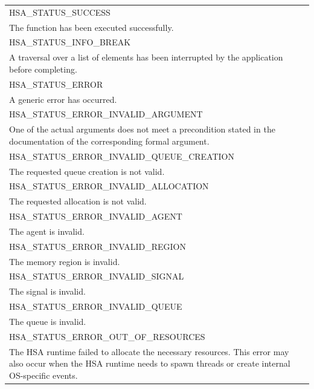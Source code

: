 \documentclass[final,oneside]{book}
\newcommand{\reftyp}[1]{#1}
\newcommand{\refenu}[1]{\reftyp{#1}}
\begin{document}
\begin{longtable}{@{\hspace{2em}}p{\linewidth-2em}}
\hspace{-2em}\refenu{HSA_\-STATUS_\-SUCCESS}\\The function has been executed successfully.\\[2mm]
\hspace{-2em}\refenu{HSA_\-STATUS_\-INFO_\-BREAK}\\A traversal over a list of elements has been interrupted by the application before completing.\\[2mm]
\hspace{-2em}\refenu{HSA_\-STATUS_\-ERROR}\\A generic error has occurred.\\[2mm]
\hspace{-2em}\refenu{HSA_\-STATUS_\-ERROR_\-INVALID_\-ARGUMENT}\\One of the actual arguments does not meet a precondition stated in the documentation of the corresponding formal argument.\\[2mm]
\hspace{-2em}\refenu{HSA_\-STATUS_\-ERROR_\-INVALID_\-QUEUE_\-CREATION}\\The requested queue creation is not valid.\\[2mm]
\hspace{-2em}\refenu{HSA_\-STATUS_\-ERROR_\-INVALID_\-ALLOCATION}\\The requested allocation is not valid.\\[2mm]
\hspace{-2em}\refenu{HSA_\-STATUS_\-ERROR_\-INVALID_\-AGENT}\\The agent is invalid.\\[2mm]
\hspace{-2em}\refenu{HSA_\-STATUS_\-ERROR_\-INVALID_\-REGION}\\The memory region is invalid.\\[2mm]
\hspace{-2em}\refenu{HSA_\-STATUS_\-ERROR_\-INVALID_\-SIGNAL}\\The signal is invalid.\\[2mm]
\hspace{-2em}\refenu{HSA_\-STATUS_\-ERROR_\-INVALID_\-QUEUE}\\The queue is invalid.\\[2mm]
\hspace{-2em}\refenu{HSA_\-STATUS_\-ERROR_\-OUT_\-OF_\-RESOURCES}\\The HSA runtime failed to allocate the necessary resources. This error may also occur when the HSA runtime needs to spawn threads or create internal OS-specific events.\\[2mm]

\end{longtable}
\end{document}
